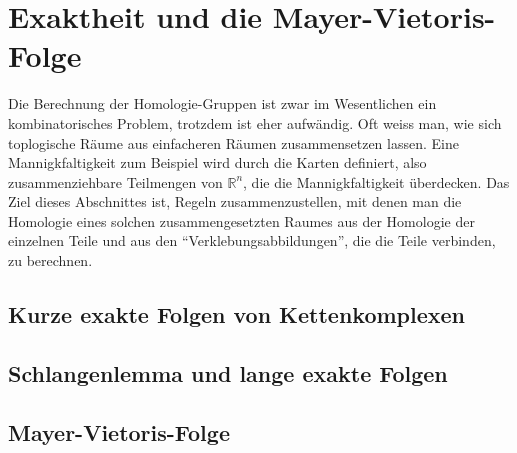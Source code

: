 %
%
%
\section{Exaktheit und die Mayer-Vietoris-Folge
\label{buch:section:mayervietoris}}
Die Berechnung der Homologie-Gruppen ist zwar im Wesentlichen ein 
kombinatorisches Problem, trotzdem ist eher aufwändig.
Oft weiss man, wie sich toplogische Räume aus einfacheren Räumen
zusammensetzen lassen.
Eine Mannigkfaltigkeit zum Beispiel wird durch die Karten
definiert, also zusammenziehbare Teilmengen von $\mathbb{R}^n$,
die die Mannigkfaltigkeit überdecken.
Das Ziel dieses Abschnittes ist, Regeln zusammenzustellen, mit denen
man die Homologie eines solchen zusammengesetzten Raumes aus der
Homologie der einzelnen Teile und aus den ``Verklebungsabbildungen'',
die die Teile verbinden, zu berechnen.

\subsection{Kurze exakte Folgen von Kettenkomplexen
\label{buch:subsection:exaktefolgen}}

\subsection{Schlangenlemma und lange exakte Folgen
\label{buch:subsection:schlangenlemma}}

\subsection{Mayer-Vietoris-Folge
\label{buch:subsection:mayervietoris}}
